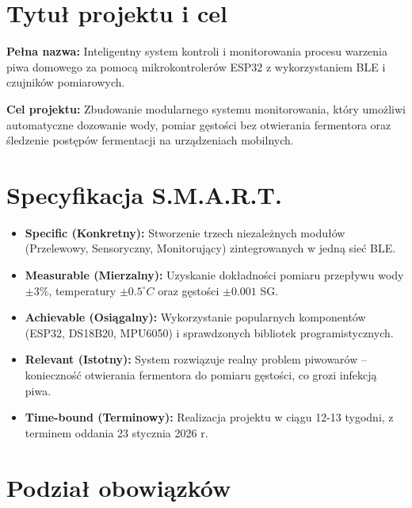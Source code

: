\documentclass[12pt,a4paper]{article}
\begin{document}
\section{Tytuł projektu i cel}
\textbf{Pełna nazwa:} Inteligentny system kontroli i monitorowania procesu warzenia piwa domowego za pomocą mikrokontrolerów ESP32 z wykorzystaniem BLE i czujników pomiarowych.

\textbf{Cel projektu:} Zbudowanie modularnego systemu monitorowania, który umożliwi automatyczne dozowanie wody, pomiar gęstości bez otwierania fermentora oraz śledzenie postępów fermentacji na urządzeniach mobilnych.

\section{Specyfikacja S.M.A.R.T.}
\begin{itemize}
    \item \textbf{Specific (Konkretny):} Stworzenie trzech niezależnych modułów (Przelewowy, Sensoryczny, Monitorujący) zintegrowanych w jedną sieć BLE.
    \item \textbf{Measurable (Mierzalny):} Uzyskanie dokładności pomiaru przepływu wody $\pm 3\%$, temperatury $\pm 0.5^\circ C$ oraz gęstości $\pm 0.001$ SG.
    \item \textbf{Achievable (Osiągalny):} Wykorzystanie popularnych komponentów (ESP32, DS18B20, MPU6050) i sprawdzonych bibliotek programistycznych.
    \item \textbf{Relevant (Istotny):} System rozwiązuje realny problem piwowarów – konieczność otwierania fermentora do pomiaru gęstości, co grozi infekcją piwa.
    \item \textbf{Time-bound (Terminowy):} Realizacja projektu w ciągu 12-13 tygodni, z terminem oddania 23 stycznia 2026 r.
\end{itemize}

\section{Podział obowiązków}
\end{document}
